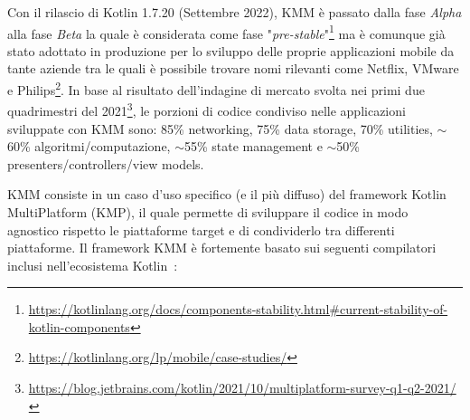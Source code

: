 Con il rilascio di Kotlin 1.7.20 (Settembre 2022), KMM è passato dalla fase \textit{Alpha} alla fase \textit{Beta} la quale è considerata come fase "\textit{pre-stable}"\footnote{\href{https://kotlinlang.org/docs/components-stability.html\#current-stability-of-kotlin-components}{https://kotlinlang.org/docs/components-stability.html\#current-stability-of-kotlin-components}} ma è comunque già stato adottato in produzione per lo sviluppo delle proprie applicazioni mobile da tante aziende tra le quali è possibile trovare nomi rilevanti come Netflix, VMware e Philips\footnote{\href{https://kotlinlang.org/lp/mobile/case-studies/}{https://kotlinlang.org/lp/mobile/case-studies/}}. In base al risultato dell'indagine di mercato svolta nei primi due quadrimestri del 2021\footnote{\href{https://blog.jetbrains.com/kotlin/2021/10/multiplatform-survey-q1-q2-2021/}{https://blog.jetbrains.com/kotlin/2021/10/multiplatform-survey-q1-q2-2021/}}, le porzioni di codice condiviso nelle applicazioni sviluppate con KMM sono: 85\% networking, 75\% data storage, 70\% utilities, $\sim$60\% algoritmi/computazione, $\sim$55\% state management e $\sim$50\% presenters/controllers/view models.

KMM consiste in un caso d'uso specifico (e il più diffuso) del framework Kotlin MultiPlatform (KMP), il quale permette di sviluppare il codice in modo agnostico rispetto le piattaforme target e di condividerlo tra differenti piattaforme. Il framework KMM è fortemente basato sui seguenti compilatori inclusi nell'ecosistema Kotlin~\cite{nagy2022simplifying}:


